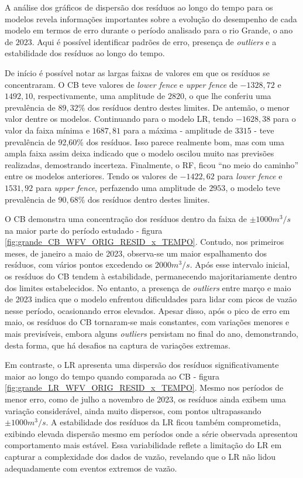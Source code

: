 A análise dos gráficos de dispersão dos resíduos ao longo do tempo para os modelos revela informações importantes sobre a evolução do desempenho de cada modelo em termos de erro durante o período analisado para o rio Grande, o ano de $2023$. Aqui é possível identificar padrões de erro, presença de \textit{outliers} e a estabilidade dos resíduos ao longo do tempo.

De início é possível notar as largas faixas de valores em que os resíduos se concentraram. O CB teve valores de \textit{lower fence} e \textit{upper fence} de $-1328,72$ e $1492,10$, respectivamente, uma amplitude de $2820$, o que lhe conferiu uma prevalência de $89,32\%$ dos resíduos dentro destes limites. De antemão, o menor valor dentre os modelos. Continuando para o modelo LR, tendo $-1628,38$ para o valor da faixa mínima e $1687,81$ para a máxima - amplitude de $3315$ - teve prevalência de 92,60\% dos resíduos. Isso parece realmente bom, mas com uma ampla faixa assim deixa indicado que o modelo oscilou muito nas previsões realizadas, demostrando incerteza. Finalmente, o RF, ficou ``no meio do caminho'' entre os modelos anteriores. Tendo os valores de $-1422,62$ para \textit{lower fence} e $1531,92$ para \textit{upper fence}, perfazendo uma amplitude de $2953$, o modelo teve prevalência de $90,68\%$ dos resíduos dentro destes limites.

O CB demonstra uma concentração dos resíduos dentro da faixa de $\pm 1000 m^3/s$ na maior parte do período estudado - figura \ref{fig:grande_CB_WFV_ORIG_RESID_x_TEMPO}. Contudo, nos primeiros meses, de janeiro a maio de 2023, observa-se um maior espalhamento dos resíduos, com vários pontos excedendo os $2000 m^3/s$. Após esse intervalo inicial, os resíduos do CB tendem à estabilidade, permanecendo majoritariamente dentro dos limites estabelecidos. No entanto, a presença de \textit{outliers} entre março e maio de 2023 indica que o modelo enfrentou dificuldades para lidar com picos de vazão nesse período, ocasionando erros elevados. Apesar disso, após o pico de erro em maio, os resíduos do CB tornaram-se mais constantes, com variações menores e mais previsíveis, embora alguns \textit{outliers} persistam no final do ano, demonstrando, desta forma, que há desafios na captura de variações extremas.

Em contraste, o LR apresenta uma dispersão dos resíduos significativamente maior ao longo do tempo quando comparada ao CB - figura \ref{fig:grande_LR_WFV_ORIG_RESID_x_TEMPO}. Mesmo nos períodos de menor erro, como de julho a novembro de 2023, os resíduos ainda exibem uma variação considerável, ainda muito dispersos, com pontos ultrapassando $\pm 1000 m^3/s$. A estabilidade dos resíduos da LR ficou também comprometida, exibindo elevada dispersão mesmo em períodos onde a série observada apresentou comportamento mais estável. Essa variabilidade reflete a limitação do LR em capturar a complexidade dos dados de vazão, revelando que o LR não lidou adequadamente com eventos extremos de vazão.

